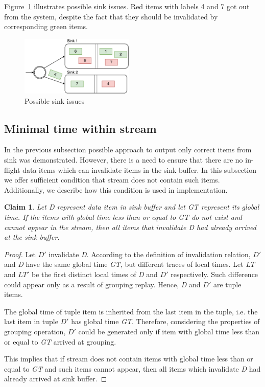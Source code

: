 Figure~\ref{invalidation-problems-figure} illustrates possible sink issues. Red items with labels 4 and 7 got out from the system, despite the fact that they should be invalidated by corresponding green items. 

\begin{figure}[htbp]
  \centering
  \includegraphics[width=0.48\textwidth]{pics/invalidation_problems}
  \caption{Possible sink issues}
  \label {invalidation-problems-figure}
\end{figure}

\subsection{Minimal time within stream}
In the previous subsection possible approach to output only correct items from sink was demonstrated. However, there is a need to ensure that there are no in-flight data items which can invalidate items in the sink buffer. In this subsection we offer sufficient condition that stream does not contain such items. Additionally, we describe how this condition is used in implementation.

\newtheorem{minimal-time-claim}{Claim}

\begin{minimal-time-claim}
Let {\it D} represent data item in sink buffer and let {\it GT} represent its global time. If the items with global time less than or equal to {\it GT} do not exist and cannot appear in the stream, then all items that invalidate {\it D} had already arrived at the sink buffer.
\end{minimal-time-claim}
\begin{proof}
Let {\it $D\prime$} invalidate {\it D}. According to the definition of invalidation relation, {\it $D\prime$} and {\it D} have the same global time {\it GT}, but different traces of local times. Let {\it LT} and {\it $LT\prime$} be the first distinct local times of {\it D} and {\it $D\prime$} respectively. Such difference could appear only as a result of grouping replay. Hence, {\it D} and {\it $D\prime$} are tuple items.

The global time of tuple item is inherited from the last item in the tuple, i.e. the last item in tuple {\it $D\prime$} has global time {\it GT}. Therefore, considering the properties of grouping operation, {\it $D\prime$} could be generated only if item with global time less than or equal to {\it GT} arrived at grouping. 

This implies that if stream does not contain items with global time less than or equal to {\it GT} and such items cannot appear, then all items which invalidate {\it D} had already arrived at sink buffer. 
\end{proof}

